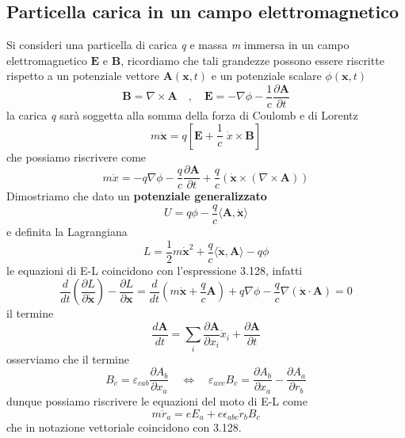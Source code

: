 \subsection{Particella carica in un campo elettromagnetico }
\noindent Si consideri una particella di carica \textit{q} e massa \textit{m} immersa in un campo elettromagnetico $\bm {E}$ e $\bm{B}$, ricordiamo che tali grandezze possono essere riscritte rispetto a un potenziale vettore $\bm{A}(\bm{x},t)$ e un potenziale scalare $\phi(\bm{x},t)$
\begin{equation*}
\mathbf{B}=\nabla \times \mathbf{A} \quad, \quad \mathbf{E}=-\nabla \phi-\frac{1}{c}\frac{\partial \mathbf{A}}{\partial t}
\end{equation*}
la carica \textit{q} sar\`{a} soggetta alla somma della forza di Coulomb e di Lorentz 
\begin{equation*}
	m \ddot{\bm{x}} = q \left [ \bm{E} + \frac{1}{c} \; \dot{x} \times \bm{B}\right ] 
\end{equation*}
che possiamo riscrivere come 
\begin{equation}
m \ddot{x}=-q \nabla \phi-\frac{q}{c} \frac{\partial \bm{A}}{\partial t}+\frac{q}{c}(\bm{\dot{x}} \times (\nabla \times \bm{A}))
\end{equation}
Dimostriamo che dato un \textbf{potenziale generalizzato}
\begin{equation}
U=q \phi-\frac{q}{c}\langle\bm{A}, \bm{\dot{x}}\rangle
\end{equation}
e definita la Lagrangiana 
\begin{equation}
L=\frac{1}{2} m \dot{\mathbf{x}}^2+\frac{q}{c}\langle \bm{\dot{x}},\mathbf{A} \rangle - q \phi
\end{equation}
le equazioni di E-L coincidono con l'espressione 3.128, infatti 
\begin{equation}
\frac{d}{d t}\left(\frac{\partial L}{\partial \dot{\mathbf{x}}}\right)-\frac{\partial L}{\partial \mathbf{x}}=\frac{d}{d t}(m \dot{\mathbf{x}}+\frac{q}{c} \mathbf{A})+q \nabla \phi-\frac{q}{c} \nabla(\dot{\mathbf{x}} \cdot \mathbf{A})=0
\end{equation}
il termine 
\begin{equation*}
	\frac{d\bm{A}}{dt} = \sum_{i} \frac{\partial \bm{A}}{\partial x_i}\dot{x}_{i} + \frac{\partial \bm{A}}{\partial t} 
\end{equation*}
osserviamo che il termine
\begin{equation*}
 B_c = \varepsilon_{cab} \frac{\partial A_b}{\partial x_a} \quad \iff \quad \varepsilon_{avc}B_c = \frac{\partial A_b}{\partial x_a} - \frac{\partial A_a}{\partial r_b}
\end{equation*}
dunque possiamo riscrivere le equazioni del moto di E-L come 
\begin{equation}
m \ddot{r}_a=e E_a+e \epsilon_{a b c} \dot{r}_b B_c
\end{equation}
 che in notazione vettoriale coincidono con 3.128.

